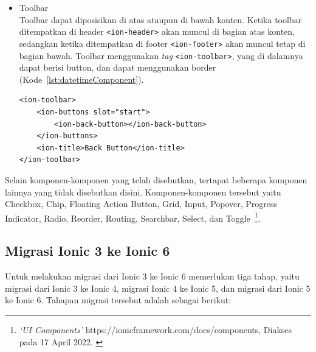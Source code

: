 \begin{itemize}
	\item Toolbar \\
	Toolbar dapat diposisikan di atas ataupun di bawah konten. Ketika toolbar ditempatkan di header \texttt{<ion-header>} akan muncul di bagian atas konten, sedangkan ketika ditempatkan di footer \texttt{<ion-footer>} akan muncul tetap di bagian bawah. Toolbar menggunakan {\it tag} \texttt{<ion-toolbar>}, yang di dalamnya dapat berisi button, dan dapat menggunakan border (Kode~\ref{lst:datetimeComponent}).

\begin{lstlisting}[label={lst:datetimeComponent}, caption=Kode Program dari Toolbar dengan Button di Dalamnya]
<ion-toolbar>
	<ion-buttons slot="start">
		<ion-back-button></ion-back-button>
	</ion-buttons>
	<ion-title>Back Button</ion-title>
</ion-toolbar>
\end{lstlisting} 
\end{itemize}
	Selain komponen-komponen yang telah disebutkan, tertapat beberapa komponen lainnya yang tidak disebutkan disini. Komponen-komponen tersebut yaitu Checkbox, Chip, Floating Action Button, Grid, Input, Popover, Progress Indicator, Radio, Reorder, Routing, Searchbar, Select, dan Toggle~\footnote{\textit{`UI Components'} https://ionicframework.com/docs/components, Diakses pada 17 April 2022. \label{ref:uiComponents}}.

\subsection{Migrasi Ionic 3 ke Ionic 6}
\label{subsec:migrasi}

Untuk melakukan migrasi dari Ionic 3 ke Ionic 6 memerlukan tiga tahap, yaitu migrasi dari Ionic 3 ke Ionic 4, migrasi Ionic 4 ke Ionic 5, dan migrasi dari Ionic 5 ke Ionic 6. Tahapan migrasi tersebut adalah sebagai berikut:

